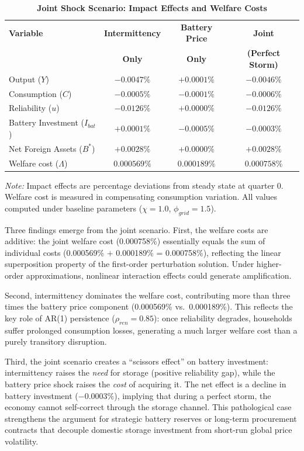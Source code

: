 \documentclass[12pt, a4paper]{article}
\begin{document}
	\begin{table}[H]
		\centering
		\caption{\textbf{Joint Shock Scenario: Impact Effects and Welfare Costs}}
		\label{tab:joint_shock}
		\renewcommand{\arraystretch}{1.3}
		\begin{tabular}{l c c c}
			\toprule
			\textbf{Variable} & \textbf{Intermittency} & \textbf{Battery Price} & \textbf{Joint} \\
			& \textbf{Only} & \textbf{Only} & \textbf{(Perfect Storm)} \\
			\midrule
			Output ($Y$) & $-0.0047\%$ & $+0.0001\%$ & $-0.0046\%$ \\
			Consumption ($C$) & $-0.0005\%$ & $-0.0001\%$ & $-0.0006\%$ \\
			Reliability ($u$) & $-0.0126\%$ & $+0.0000\%$ & $-0.0126\%$ \\
			Battery Investment ($I_{bat}$) & $+0.0001\%$ & $-0.0005\%$ & $-0.0003\%$ \\
			Net Foreign Assets ($B^*$) & $+0.0028\%$ & $+0.0000\%$ & $+0.0028\%$ \\
			\midrule
			Welfare cost ($\Lambda$) & $0.000569\%$ & $0.000189\%$ & $0.000758\%$ \\
			\bottomrule
		\end{tabular}
		\vspace{0.2cm}
		\parbox{\textwidth}{\footnotesize \textit{Note:} Impact effects are percentage deviations from steady state at quarter 0. Welfare cost is measured in compensating consumption variation. All values computed under baseline parameters ($\chi = 1.0$, $\phi_{grid} = 1.5$).}
	\end{table}

	Three findings emerge from the joint scenario. First, the welfare costs are additive: the joint welfare cost (0.000758\%) essentially equals the sum of individual costs (0.000569\% $+$ 0.000189\% = 0.000758\%), reflecting the linear superposition property of the first-order perturbation solution. Under higher-order approximations, nonlinear interaction effects could generate amplification.

	Second, intermittency dominates the welfare cost, contributing more than three times the battery price component (0.000569\% vs.\ 0.000189\%). This reflects the key role of AR(1) persistence ($\rho_{ren}=0.85$): once reliability degrades, households suffer prolonged consumption losses, generating a much larger welfare cost than a purely transitory disruption.

	Third, the joint scenario creates a ``scissors effect'' on battery investment: intermittency raises the \textit{need} for storage (positive reliability gap), while the battery price shock raises the \textit{cost} of acquiring it. The net effect is a decline in battery investment ($-0.0003\%$), implying that during a perfect storm, the economy cannot self-correct through the storage channel. This pathological case strengthens the argument for strategic battery reserves or long-term procurement contracts that decouple domestic storage investment from short-run global price volatility.
\end{document}
